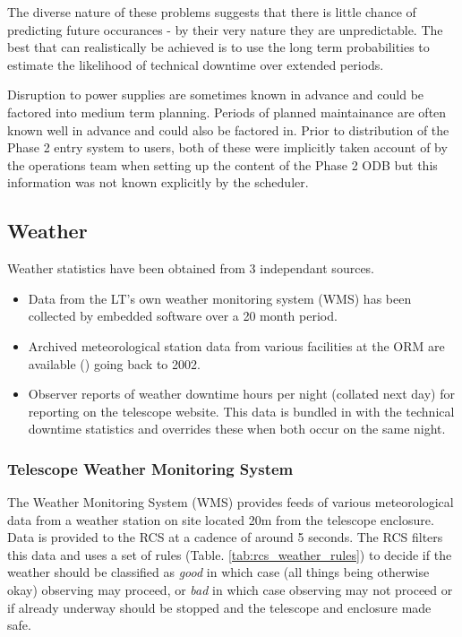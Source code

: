 The diverse nature of these problems suggests that there is little chance of predicting future occurances - by their very nature they are unpredictable. The best that can realistically be achieved is to use the long term probabilities to estimate the likelihood of technical downtime over extended periods. 

Disruption to power supplies are sometimes known in advance and could be factored into medium term planning. Periods of planned maintainance are often known well in advance and could also be factored in. Prior to distribution of the Phase 2 entry system to users, both of these were implicitly taken account of by the operations team when setting up the content of the Phase 2 ODB but this information was not known explicitly by the scheduler.

\subsection{Weather}  
Weather statistics have been obtained from 3 independant sources.
\begin{itemize}
\item Data from the LT's own weather monitoring system (WMS) has been collected by embedded software over a 20 month period. 

\item Archived meteorological station data from various facilities at the ORM are available (\cite{sorensen02cat}) going back to 2002.

\item Observer reports of weather downtime hours per night (collated next day) for reporting on the telescope website. This data is bundled in with the technical downtime statistics and overrides these when both occur on the same night.
\end{itemize}


\subsubsection{Telescope Weather Monitoring System}%
 The Weather Monitoring System (WMS) provides feeds of various meteorological data from a weather station on site located 20m from the telescope enclosure.  Data is provided to the RCS at a cadence of around 5 seconds. The RCS filters this data and uses a set of rules (Table. \ref{tab:rcs_weather_rules}) to decide if the weather should be classified as \emph{good} in which case (all things being otherwise okay) observing may proceed, or \emph{bad} in which case observing may not proceed or if already underway should be stopped and the telescope and enclosure made safe.

